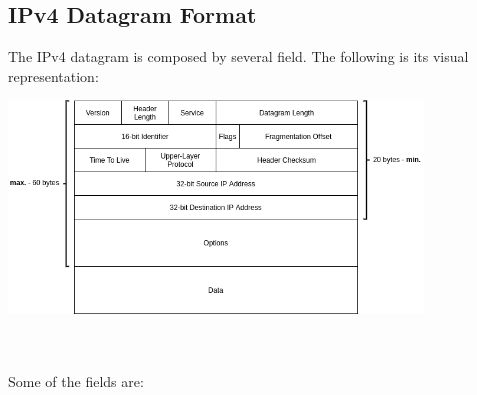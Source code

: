 \documentclass{article}
\begin{document}
\subsection{IPv4 Datagram Format}
The IPv4 datagram is composed by several field. The following is its visual representation: \\
\centerline{\includegraphics[width=11cm]{./assets/ipv4.png}} \\ \\ 
Some of the fields are:
\end{document}
